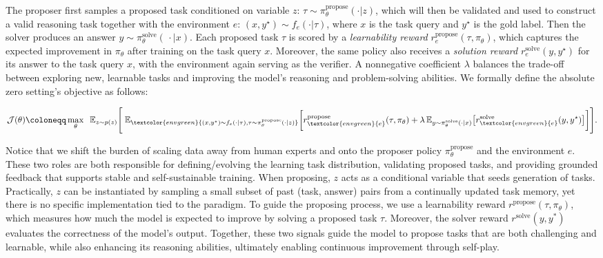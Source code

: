 \documentclass{article}
\begin{document}
The proposer first samples a proposed task conditioned on variable $z$:  \(\tau\sim\pi_\theta^{\text{propose}}( \cdot | z)\), which will then be validated and used to construct a valid reasoning task together with the environment $e$: $(x,y^\star)\sim f_e( \cdot | \tau)$, where \(x\) is the task query and \(y^\star\) is the gold label. Then the solver produces an answer $y \sim \pi_\theta^{\text{solve}}(\,\cdot\mid  x)$. Each proposed task $\tau$ is scored by a \emph{learnability reward} $r^\text{propose}_{e}(\tau, \pi_\theta)$, which captures the expected improvement in $\pi_\theta$ after training on the task query $x$. Moreover, the same policy also receives a \emph{solution reward} $r^\text{solve}_e(y, y^\star)$ for its answer to the task query \(x\), with the environment again serving as the verifier. A nonnegative coefficient $\lambda$ balances the trade-off between exploring new, learnable tasks and improving the model's reasoning and problem-solving abilities. We formally define the absolute zero setting's objective as follows:

\begin{align}
    \mathcal{J}(\theta)\coloneqq\max_{\theta}\;\; \mathbb{E}_{z \sim p(z)}\Bigg[ \;
    \mathbb{E}_{\textcolor{envgreen}{(x, y^\star) \sim f_e( \cdot | \tau), \tau\sim\pi_\theta^{\text{propose}}( \cdot | z)}}\bigg[
    r^\text{propose}_{\textcolor{envgreen}{e}}(\tau, \pi_\theta) + \lambda \,
    \mathbb{E}_{y \sim \pi_\theta^{\text{solve}}(\cdot \mid x)}\big[ r^\text{solve}_{\textcolor{envgreen}{e}}(y, y^\star) \big]
    \bigg]
    \Bigg].
    \label{eq:absolute_zero_objective}
\end{align}

Notice that we shift the burden of scaling data away from \textcolor{humanred}{human experts} and onto the \textcolor{envgreen}{proposer policy \(\pi_\theta^\text{propose}\)} and the \textcolor{envgreen}{environment \(e\)}. These two roles are both responsible for defining/evolving the learning task distribution, validating proposed tasks, and providing grounded feedback that supports stable and self-sustainable training. When proposing, $z$ acts as a conditional variable that seeds generation of tasks. Practically, $z$ can be instantiated by sampling a small subset of past (task, answer) pairs from a continually updated task memory, yet there is no specific implementation tied to the paradigm. To guide the proposing process, we use a learnability reward \(r^\text{propose}(\tau, \pi_\theta)\), which measures how much the model is expected to improve by solving a proposed task \(\tau\). Moreover, the solver reward \(r^\text{solve}(y, y^*)\) evaluates the correctness of the model's output. Together, these two signals guide the model to propose tasks that are both challenging and learnable, while also enhancing its reasoning abilities, ultimately enabling continuous improvement through self-play.
\end{document}
